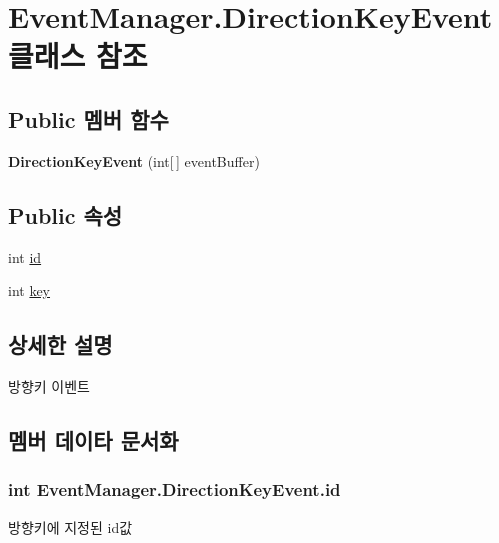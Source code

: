\hypertarget{class_event_manager_1_1_direction_key_event}{}\section{Event\+Manager.\+Direction\+Key\+Event 클래스 참조}
\label{class_event_manager_1_1_direction_key_event}
\subsection*{Public 멤버 함수}
\begin{DoxyCompactItemize}
\item 
\hypertarget{class_event_manager_1_1_direction_key_event_a21075f8fcd43d33f0fa18f0db7278c08}{}{\bfseries Direction\+Key\+Event} (int\mbox{[}$\,$\mbox{]} event\+Buffer)\label{class_event_manager_1_1_direction_key_event_a21075f8fcd43d33f0fa18f0db7278c08}

\end{DoxyCompactItemize}
\subsection*{Public 속성}
\begin{DoxyCompactItemize}
\item 
int \hyperlink{class_event_manager_1_1_direction_key_event_a10170a9df673961d812f0141eb7debc5}{id}
\item 
int \hyperlink{class_event_manager_1_1_direction_key_event_abb8a5f31e506640b8b8ef049ef848607}{key}
\end{DoxyCompactItemize}


\subsection{상세한 설명}
방향키 이벤트 

\subsection{멤버 데이타 문서화}
\hypertarget{class_event_manager_1_1_direction_key_event_a10170a9df673961d812f0141eb7debc5}{}
\subsubsection[{id}]{\setlength{\rightskip}{0pt plus 5cm}int Event\+Manager.\+Direction\+Key\+Event.\+id}\label{class_event_manager_1_1_direction_key_event_a10170a9df673961d812f0141eb7debc5}
방향키에 지정된 id값 \hypertarget{class_event_manager_1_1_direction_key_event_abb8a5f31e506640b8b8ef049ef848607}{}
